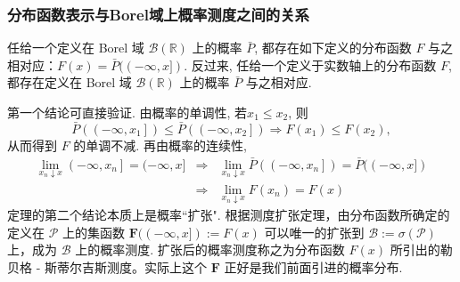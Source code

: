 \documentclass[Prob-All.tex]{subfiles}
\begin{document}
\begin{frame}
	\frametitle{分布函数表示与Borel域上概率测度之间的关系}
\begin{thm}
任给一个定义在 Borel 域 \( \mathcal{B}(\mathbb{R}) \) 上的概率 \( \bar{P} \), 都存在如下定义的分布函数 \( F \) 与之相对应：$	F(x)=\bar{P}((-\infty, x])$. 反过来, 任给一个定义于实数轴上的分布函数 $F$, 都存在定义在 Borel 域 $\mathcal{B}(\mathbb{R})$ 上的概率 $\bar{P}$ 与之相对应.
\end{thm}

\pause

\zheng
第一个结论可直接验证. 由概率的单调性, 若$x_{1} \leqslant x_{2}$, 则
{\small \[\bar{P}\left(\left(-\infty, x_{1}\right]\right) \leqslant \bar{P}\left(\left(-\infty, x_{2}\right]\right)\Rightarrow F\left(x_{1}\right) \leqslant F\left(x_{2}\right),\]}从而得到 $F$ 的单调不减. \pause 再由概率的连续性,
{\small \begin{eqnarray*}
	\lim _{x_{n} \downarrow x}\left(-\infty, x_{n}\right]=(-\infty, x]
	&\Rightarrow&  \lim _{x_{n} \downarrow x} \bar{P}\left(\left(-\infty, x_{n}\right]\right)=\bar{P}((-\infty, x]) \\
	&\Rightarrow&  \lim _{x_{n} \downarrow x} F\left(x_{n}\right)=F(x)
\end{eqnarray*}}%
\pause
定理的第二个结论本质上是概率``扩张". 根据测度扩张定理，由分布函数所确定的定义在 $\mathcal{P}$ 上的集函数 $\mathbf{F}((-\infty, x]):=F (x)$ 可以唯一的扩张到 $\mathcal{B}:=\sigma (\mathcal{P})$ 上，成为 $\mathcal{B}$ 上的概率测度. 扩张后的概率测度称之为分布函数 $F (x)$ 所引出的勒贝格 - 斯蒂尔吉斯测度。实际上这个 $\mathbf{F}$ 正好是我们前面引进的概率分布.

\end{frame}
\end{document}
